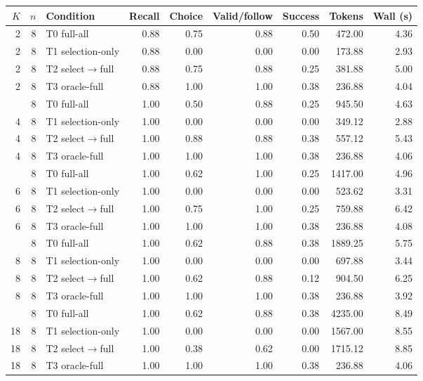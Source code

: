 \begin{tabular}{rrl r@{\hspace{1.1em}}r@{\hspace{1.1em}}r@{\hspace{1.1em}}r@{\hspace{1.1em}}r@{\hspace{1.1em}}r}
\toprule
$K$ & $n$ & Condition & Recall & Choice & Valid/follow & Success & Tokens & Wall (s) \\
\midrule
2 & 8 & T0 full-all & 0.88 & 0.75 & 0.88 & 0.50 & 472.00 & 4.36 \\
2 & 8 & T1 selection-only & 0.88 & 0.00 & 0.00 & 0.00 & 173.88 & 2.93 \\
2 & 8 & T2 select$\rightarrow$full & 0.88 & 0.75 & 0.88 & 0.25 & 381.88 & 5.00 \\
2 & 8 & T3 oracle-full & 0.88 & 1.00 & 1.00 & 0.38 & 236.88 & 4.04 \\
\addlinespace
4 & 8 & T0 full-all & 1.00 & 0.50 & 0.88 & 0.25 & 945.50 & 4.63 \\
4 & 8 & T1 selection-only & 1.00 & 0.00 & 0.00 & 0.00 & 349.12 & 2.88 \\
4 & 8 & T2 select$\rightarrow$full & 1.00 & 0.88 & 0.88 & 0.38 & 557.12 & 5.43 \\
4 & 8 & T3 oracle-full & 1.00 & 1.00 & 1.00 & 0.38 & 236.88 & 4.06 \\
\addlinespace
6 & 8 & T0 full-all & 1.00 & 0.62 & 1.00 & 0.25 & 1417.00 & 4.96 \\
6 & 8 & T1 selection-only & 1.00 & 0.00 & 0.00 & 0.00 & 523.62 & 3.31 \\
6 & 8 & T2 select$\rightarrow$full & 1.00 & 0.75 & 1.00 & 0.25 & 759.88 & 6.42 \\
6 & 8 & T3 oracle-full & 1.00 & 1.00 & 1.00 & 0.38 & 236.88 & 4.08 \\
\addlinespace
8 & 8 & T0 full-all & 1.00 & 0.62 & 0.88 & 0.38 & 1889.25 & 5.75 \\
8 & 8 & T1 selection-only & 1.00 & 0.00 & 0.00 & 0.00 & 697.88 & 3.44 \\
8 & 8 & T2 select$\rightarrow$full & 1.00 & 0.62 & 0.88 & 0.12 & 904.50 & 6.25 \\
8 & 8 & T3 oracle-full & 1.00 & 1.00 & 1.00 & 0.38 & 236.88 & 3.92 \\
\addlinespace
18 & 8 & T0 full-all & 1.00 & 0.62 & 0.88 & 0.38 & 4235.00 & 8.49 \\
18 & 8 & T1 selection-only & 1.00 & 0.00 & 0.00 & 0.00 & 1567.00 & 8.55 \\
18 & 8 & T2 select$\rightarrow$full & 1.00 & 0.38 & 0.62 & 0.00 & 1715.12 & 8.85 \\
18 & 8 & T3 oracle-full & 1.00 & 1.00 & 1.00 & 0.38 & 236.88 & 4.06 \\
\bottomrule
\end{tabular}
